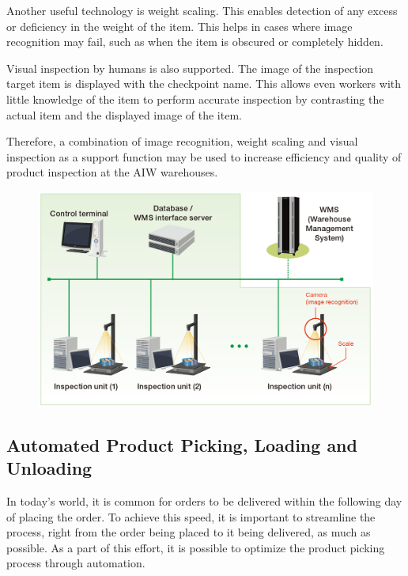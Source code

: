 \documentclass{report}
\begin{document}
Another useful technology is weight scaling. This enables detection of any excess or deficiency in the weight of the item. This helps in cases where image recognition may fail, such as when the item is obscured or completely hidden.

Visual inspection by humans is also supported. The image of the inspection target item is displayed with the checkpoint name. This allows even workers with little knowledge of the item to perform accurate inspection by contrasting the actual item and the displayed image of the item.

Therefore, a combination of image recognition, weight scaling and visual inspection as a support function may be used to increase efficiency and quality of product inspection at the AIW warehouses.

\begin{figure}[H]
    
    \centering
    \includegraphics[scale=0.4]{product_ins.png}
    \caption{}
    
\end{figure}

\subsection{Automated Product Picking, Loading and Unloading}

In today's world, it is common for orders to be delivered within the following day of placing the order. To achieve this speed, it is important to streamline the process, right from the order being placed to it being delivered, as much as possible. As a part of this effort, it is possible to optimize the product picking process through automation.
\end{document}
